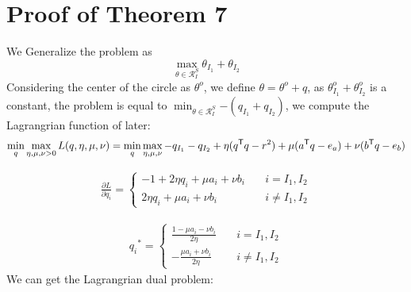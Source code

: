 \section{Proof of Theorem 7}
We Generalize the problem as 
\begin{equation}
\max_{\theta \in \mathcal{R}^{S}_{I}}{ \theta_{I_1} +\theta_{I_2} }
\end{equation}
Considering the center of the circle as $\theta^o$, we define $\theta = \theta^{o} + q$, as ${ \theta^{o}_{I_1} +\theta^{o}_{I_2} }$ is a constant, the problem is equal to  $\min_{\theta \in \mathcal{R}^{S}_{I}}{- ( q_{I_1} +q_{I_2} )}$, we compute the Lagrangrian function of later:
\begin{equation}
\min_{q} \max_{\eta,\mu,\nu > 0}  L(q,\eta,\mu,\nu) =\min_{q}\max_{\eta,\mu,\nu}  - {q_{I_1} - q_{I_2}  + \eta( q^{\mathsf T}q - r^2)+\mu( a^{\mathsf T}q - e_a ) + \nu( b^{\mathsf T}q - e_b )}
\end{equation}

 \begin{equation}
\begin{split} 
\frac{\partial L}{\partial q_i} =  \left\{
\begin{aligned}
-1 + 2\eta q_i +\mu a_i + \nu b_i \quad&  i = I_1, I_2\\
  2\eta q_i +\mu a_i + \nu b_i \quad&  i \neq I_1, I_2
\end{aligned}
\right.
 \end{split}
\label{eq:lang1}
\end{equation}

 \begin{equation}
\begin{split} 
{q_i}^{*} =  \left\{
\begin{aligned}
\frac{1- \mu a_i - \nu b_i}{2\eta} \quad&  i = I_1, I_2\\
-\frac{\mu a_i + \nu b_i}{2\eta} \quad&  i \neq I_1, I_2
\end{aligned}
\right.
 \end{split}
\label{eq:lang1}
\end{equation}
We can get the Lagrangrian dual problem:

